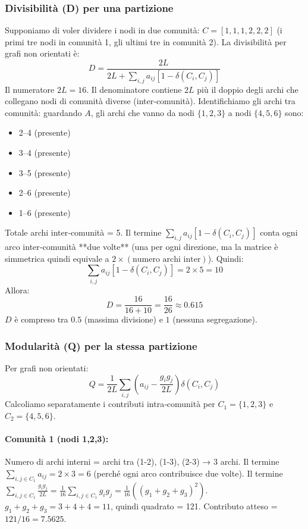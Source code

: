 \subsubsection{Divisibilità (D) per una partizione}
Supponiamo di voler dividere i nodi in due comunità: $C = [1,1,1,2,2,2]$ (i primi tre nodi in comunità 1, gli ultimi tre in comunità 2).
La divisibilità per grafi non orientati è:
\[
D = \frac{2L}{2L + \sum_{i,j} a_{ij}[1-\delta(C_i,C_j)]}
\]
Il numeratore $2L = 16$. Il denominatore contiene $2L$ più il doppio degli archi che collegano nodi di comunità diverse (inter‑comunità). Identifichiamo gli archi tra comunità: guardando $A$, gli archi che vanno da nodi $\{1,2,3\}$ a nodi $\{4,5,6\}$ sono:
\begin{itemize}
    \item 2–4 (presente)
    \item 3–4 (presente)
    \item 3–5 (presente)
    \item 2–6 (presente)
    \item 1–6 (presente)
\end{itemize}
Totale archi inter‑comunità = 5. Il termine $\sum_{i,j} a_{ij}[1-\delta(C_i,C_j)]$ conta ogni arco inter‑comunità **due volte** (una per ogni direzione, ma la matrice è simmetrica quindi equivale a $2 \times (\text{numero archi inter})$). Quindi:
\[
\sum_{i,j} a_{ij}[1-\delta(C_i,C_j)] = 2 \times 5 = 10
\]
Allora:
\[
D = \frac{16}{16 + 10} = \frac{16}{26} \approx 0.615
\]
$D$ è compreso tra $0.5$ (massima divisione) e $1$ (nessuna segregazione).

\subsubsection{Modularità (Q) per la stessa partizione}
Per grafi non orientati:
\[
Q = \frac{1}{2L} \sum_{i,j} \left( a_{ij} - \frac{g_i g_j}{2L} \right) \delta(C_i,C_j)
\]
Calcoliamo separatamente i contributi intra‑comunità per $C_1 = \{1,2,3\}$ e $C_2 = \{4,5,6\}$.

\paragraph{Comunità 1 (nodi 1,2,3):}
Numero di archi interni = archi tra (1-2), (1-3), (2-3) → 3 archi.
Il termine $\sum_{i,j \in C_1} a_{ij} = 2 \times 3 = 6$ (perché ogni arco contribuisce due volte).
Il termine $\sum_{i,j \in C_1} \frac{g_i g_j}{2L} = \frac{1}{16} \sum_{i,j \in C_1} g_i g_j = \frac{1}{16} \left( (g_1+g_2+g_3)^2 \right)$.
$g_1+g_2+g_3 = 3+4+4 = 11$, quindi quadrato = 121.
Contributo atteso = $121/16 = 7.5625$.

